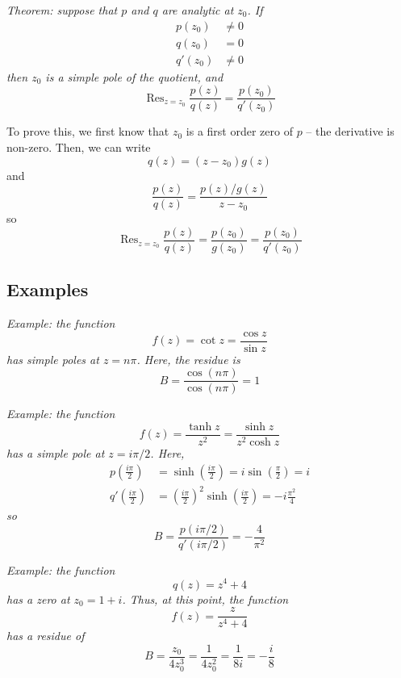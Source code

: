 \documentclass{article}
\DeclareMathOperator{\Res}{Res}
\begin{document}
\textit{Theorem: suppose that $p$ and $q$ are analytic at $z_0$. If 
\begin{align*}
	p(z_0) &\neq 0 \\
	q(z_0) &= 0 \\
	q'(z_0) &\neq 0
\end{align*}
then $z_0$ is a simple pole of the quotient, and
\[
	\Res_{z = z_0} \frac{p(z)}{q(z)} = \frac{p(z_0)}{q'(z_0)}
\]}

To prove this, we first know that $z_0$ is a first order zero of $p$ -- the derivative is non-zero. Then, we can write
\[
	q(z) = (z - z_0) g(z)
\]
and
\[
	\frac{p(z)}{q(z)} = \frac{p(z) / g(z)}{z - z_0}
\]
so
\[
	\Res_{z = z_0} \frac{p(z)}{q(z)}
	= \frac{p(z_0)}{g (z_0)}
	= \frac{p(z_0)}{q'(z_0)}
\]

\subsection{Examples}
\textit{Example: the function
\[
	f(z) = \cot z = \frac{\cos z}{\sin z}
\]
has simple poles at $z = n \pi$. Here, the residue is
\[
	B = \frac{\cos (n\pi)}{\cos (n\pi)} = 1
\]}

\textit{Example: the function
\[
	f(z) = \frac{\tanh z}{z^2} = \frac{\sinh z}{z^2 \cosh z}
\]
has a simple pole at $z = i \pi/2$. Here,
\begin{align*}
	p\left(\frac{i\pi}{2}\right) 
	&= \sinh\left(\frac{i\pi}{2}\right) 
	= i\sin\left(\frac{\pi}{2}\right) 
	= i \\
	q'\left(\frac{i\pi}{2}\right) 
	&= \left(\frac{i\pi}{2}\right)^2 \sinh \left(\frac{i\pi}{2}\right)
	= -i\frac{\pi^2}{4} 
\end{align*}
so
\[
	B 
	= \frac{p(i\pi/2)}{q'(i\pi/2)}
	= -\frac{4}{\pi^2}
\] }

\textit{Example: the function
\[
	q(z) = z^4 + 4
\]
has a zero at $z_0 = 1 + i$. Thus, at this point, the function
\[
	f(z) = \frac{z}{z^4 + 4}
\]
has a residue of
\[
	B 
	= \frac{z_0}{4z_0^3}
	= \frac{1}{4z_0^2}
	= \frac{1}{8i}
	= -\frac{i}{8}
\]}
\end{document}

